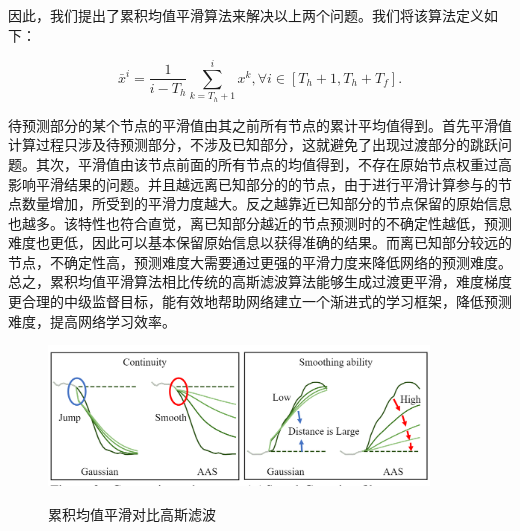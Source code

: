 因此，我们提出了累积均值平滑算法来解决以上两个问题。我们将该算法定义如下：

\begin{equation}
    \bar{x}^i = \frac{1}{i-T_h}\sum_{k=T_h+1}^{i}x^k, \forall i\in[T_h+1, T_h+T_f].
    \label{equation:AAS}
\end{equation}

待预测部分的某个节点的平滑值由其之前所有节点的累计平均值得到。首先平滑值计算过程只涉及待预测部分，不涉及已知部分，这就避免了出现过渡部分的跳跃问题。其次，平滑值由该节点前面的所有节点的均值得到，不存在原始节点权重过高影响平滑结果的问题。并且越远离已知部分的的节点，由于进行平滑计算参与的节点数量增加，所受到的平滑力度越大。反之越靠近已知部分的节点保留的原始信息也越多。该特性也符合直觉，离已知部分越近的节点预测时的不确定性越低，预测难度也更低，因此可以基本保留原始信息以获得准确的结果。而离已知部分较远的节点，不确定性高，预测难度大需要通过更强的平滑力度来降低网络的预测难度。总之，累积均值平滑算法相比传统的高斯滤波算法能够生成过渡更平滑，难度梯度更合理的中级监督目标，能有效地帮助网络建立一个渐进式的学习框架，降低预测难度，提高网络学习效率。

\begin{figure}[ht]
    \centering
    \includegraphics[width=0.9\textwidth]{FigMa/AAS.png}\\
    \vspace{-0.3cm}
    \caption{累积均值平滑对比高斯滤波}
    \label{fig:AAS}
\end{figure}